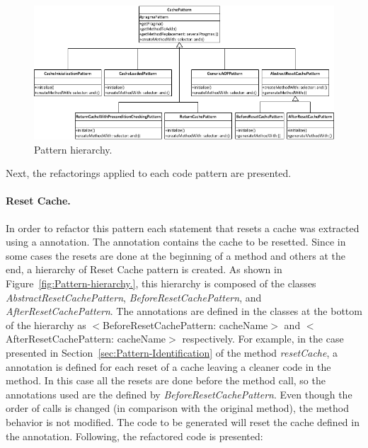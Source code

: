 \documentclass[preprint,10pt]{sigplanconf}
\newcommand{\secref}[1]{Section~\ref{sec:#1}\xspace}
\newcommand{\figlabel}[1]{\label{fig:#1}}
\newcommand{\figref}[1]{Figure~\ref{fig:#1}\xspace}
\begin{document}
%
\begin{figure}
\begin{centering}
\includegraphics[bb=21bp 541bp 561bp 789bp,scale=0.7]{PatternInheritance}
\par\end{centering}

\caption{Pattern hierarchy.\figlabel{Pattern-hierarchy}}

\end{figure}


Next, the refactorings applied to each code pattern are presented.

\paragraph{Reset Cache.} In order to refactor this pattern each statement
that resets a cache was extracted using a annotation. The annotation contains
the cache to be resetted. Since in some cases the resets are done
at the beginning of a method and others at the end, a hierarchy of
Reset Cache pattern is created. As shown in \figref{Pattern-hierarchy.},
this hierarchy is composed of the classes \emph{AbstractResetCachePattern},
\emph{BeforeResetCachePattern}, and \emph{AfterResetCachePattern}.
The annotations are defined in the classes at the bottom of the hierarchy
as $<$BeforeResetCachePattern: cacheName$>$ and $<$AfterResetCachePattern:
cacheName$>$ respectively. For example, in the case presented in 
\secref{Pattern-Identification} of the method \emph{resetCache},
a annotation is defined for each reset of a cache leaving a cleaner code
in the method. In this case all the resets are done before the method
call, so the annotations used are the defined by \emph{BeforeResetCachePattern}.
Even though the order of calls is changed (in comparison with the
original method), the method behavior is not modified. The code to
be generated will reset the cache defined
in the annotation. Following, the refactored code is presented:
\end{document}
